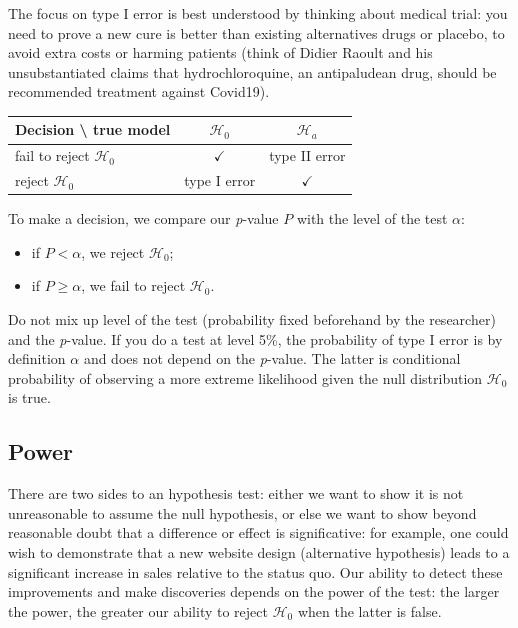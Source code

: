 \documentclass[
  11pt,
  letterpaper,
]{book}
\providecommand{\tightlist}{%
  \setlength{\itemsep}{0pt}\setlength{\parskip}{0pt}}
\theoremstyle{definition}
\theoremstyle{definition}
\theoremstyle{definition}
\theoremstyle{remark}
\begin{document}
The focus on type I error is best understood by thinking about medical trial: you need to prove a new cure is better than existing alternatives drugs or placebo, to avoid extra costs or harming patients (think of Didier Raoult and his unsubstantiated claims that hydrochloroquine, an antipaludean drug, should be recommended treatment against Covid19).

\begin{longtable}[]{@{}lcc@{}}
\toprule
\textbf{Decision} \textbackslash{} \textbf{true model} & \(\mathscr{H}_0\) & \(\mathscr{H}_a\)\tabularnewline
\midrule
\endhead
fail to reject \(\mathscr{H}_0\) & \(\checkmark\) & type II error\tabularnewline
reject \(\mathscr{H}_0\) & type I error & \(\checkmark\)\tabularnewline
\bottomrule
\end{longtable}

To make a decision, we compare our \emph{p}-value \(P\) with the level of the test \(\alpha\):

\begin{itemize}
\tightlist
\item
  if \(P < \alpha\), we reject \(\mathscr{H}_0\);
\item
  if \(P \geq \alpha\), we fail to reject \(\mathscr{H}_0\).
\end{itemize}

Do not mix up level of the test (probability fixed beforehand by the researcher) and the \emph{p}-value. If you do a test at level 5\%, the probability of type I error is by definition \(\alpha\) and does not depend on the \emph{p}-value. The latter is conditional probability of observing a more extreme likelihood given the null distribution \(\mathscr{H}_0\) is true.

\hypertarget{power}{%
\subsection{Power}\label{power}}

There are two sides to an hypothesis test: either we want to show it is not unreasonable to assume the null hypothesis, or else we want to show beyond reasonable doubt that a difference or effect is significative: for example, one could wish to demonstrate that a new website design (alternative hypothesis) leads to a significant increase in sales relative to the status quo. Our ability to detect these improvements and make discoveries depends on the power of the test: the larger the power, the greater our ability to reject \(\mathscr{H}_0\) when the latter is false.
\end{document}
